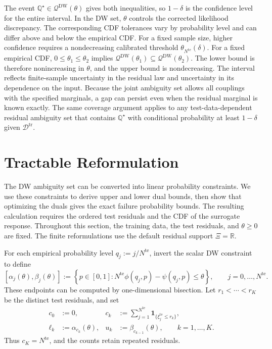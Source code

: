 \documentclass[review,11pt,3p,authoryear,nopreprintline]{elsarticle}
\begin{document}
The event $\mathbb Q^\star\in\mathscr Q^{\mathrm{DW}}(\theta)$ gives both inequalities, so $1-\delta$ is the confidence level for the entire interval. In the DW set, $\theta$ controls the corrected likelihood discrepancy. The corresponding CDF tolerances vary by probability level and can differ above and below the empirical CDF. For a fixed sample size, higher confidence requires a nondecreasing calibrated threshold $\theta_{N^{\mathrm{te}}}(\delta)$. For a fixed empirical CDF, $0\le\theta_1\le\theta_2$ implies $\mathscr Q^{\mathrm{DW}}(\theta_1)\subseteq\mathscr Q^{\mathrm{DW}}(\theta_2)$. The lower bound is therefore nonincreasing in $\theta$, and the upper bound is nondecreasing. The interval reflects finite-sample uncertainty in the residual law and uncertainty in its dependence on the input. Because the joint ambiguity set allows all couplings with the specified marginals, a gap can persist even when the residual marginal is known exactly. The same coverage argument applies to any test-data-dependent residual ambiguity set that contains $\mathbb Q^\star$ with conditional probability at least $1-\delta$ given $\mathcal D^{\mathrm{tr}}$.

\section{Tractable Reformulation}
\label{sec-reformulation}

The DW ambiguity set can be converted into linear probability constraints. We use these constraints to derive upper and lower dual bounds, then show that optimizing the duals gives the exact failure probability bounds. The resulting calculation requires the ordered test residuals and the CDF of the surrogate response. Throughout this section, the training data, the test residuals, and $\theta\ge0$ are fixed. The finite reformulations use the default residual support $\Xi=\mathbb R$.

For each empirical probability level $q_j:=j/N^{\mathrm{te}}$, invert the scalar DW constraint to define
\begin{equation}
  \left[\alpha_j(\theta),\beta_j(\theta)\right]
  :=\left\{p\in[0,1]:
  N^{\mathrm{te}}\phi\left(q_j,p\right)-\psi\left(q_j,p\right)\le\theta\right\},
  \qquad j=0,\ldots,N^{\mathrm{te}}.
  \label{eq-dw-rank-acceptance}
\end{equation}
These endpoints can be computed by one-dimensional bisection. Let $r_1<\cdots<r_K$ be the distinct test residuals, and set
\begin{equation}
  \begin{aligned}
    c_0&:=0,&
    c_k&:=\sum_{j=1}^{N^{\mathrm{te}}}\mathbf1_{\{\xi_j^{\mathrm{te}}\le r_k\}},\\
    \ell_k&:=\alpha_{c_k}(\theta),&
    u_k&:=\beta_{c_{k-1}}(\theta),\qquad k=1,\ldots,K.
  \end{aligned}
  \label{eq-dw-counts-and-levels}
\end{equation}
Thus $c_K=N^{\mathrm{te}}$, and the counts retain repeated residuals.
\end{document}
